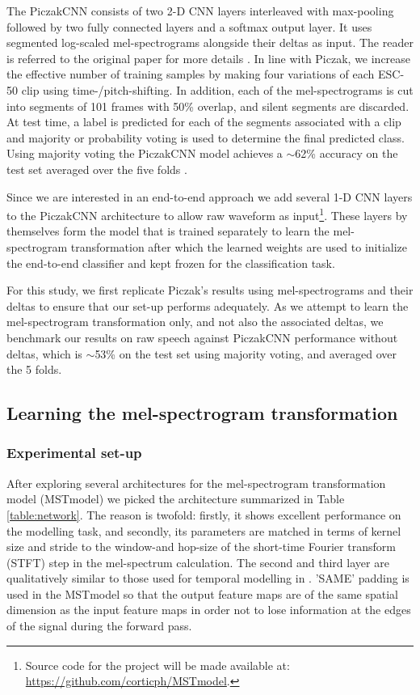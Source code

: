 \documentclass{article}
\begin{document}
The PiczakCNN consists of two 2-D CNN layers interleaved with max-pooling followed by two fully connected layers and a softmax output layer. It uses segmented log-scaled mel-spectrograms alongside their deltas as input. The reader is referred to the original paper for more details \cite{piczak2015environmental}. In line with Piczak, we increase the effective number of training samples by making four variations of each ESC-50 clip using time-/pitch-shifting. In addition, each of the mel-spectrograms is cut into segments of 101 frames with 50\% overlap, and silent segments are discarded. At test time, a label is predicted for each of the segments associated with a clip and majority or probability voting is used to determine the final predicted class. Using majority voting the PiczakCNN model achieves a $\sim$62\% accuracy on the test set averaged over the five folds \cite{piczak2015environmental}.

Since we are interested in an end-to-end approach we add several 1-D CNN layers to the PiczakCNN architecture to allow raw waveform as input\footnote{Source code for the project will be made available at: \url{https://github.com/corticph/MSTmodel}.}. These layers by themselves form the model that is trained separately to learn the mel-spectrogram transformation after which the learned weights are used to initialize the end-to-end classifier and kept frozen for the classification task.

For this study, we first replicate Piczak's results using mel-spectrograms and their deltas to ensure that our set-up performs adequately. As we attempt to learn the mel-spectrogram transformation only, and not also the associated deltas, we benchmark our results on raw speech against PiczakCNN performance without deltas, which is $\sim$53\% on the test set using majority voting, and averaged over the 5 folds. 

\subsection{Learning the mel-spectrogram transformation}
\subsubsection{Experimental set-up}
After exploring several architectures for the mel-spectrogram transformation model (MSTmodel) we picked the architecture summarized in Table \ref{table:network}. The reason is twofold: firstly, it shows excellent performance on the modelling task, and secondly, its parameters are matched in terms of kernel size and stride to the window-and hop-size of the short-time Fourier transform (STFT) step in the mel-spectrum calculation. The second and third layer are qualitatively similar to those used for temporal modelling in \cite{collobert2016wav2letter}. 'SAME' padding is used in the MSTmodel so that the output feature maps are of the same spatial dimension as the input feature maps in order not to lose information at the edges of the signal during the forward pass.
\end{document}
